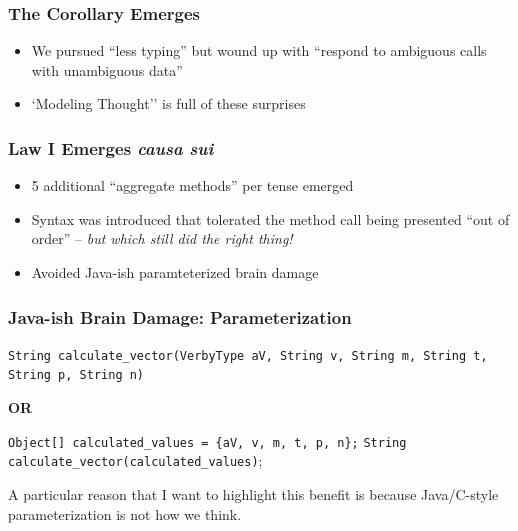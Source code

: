 \documentclass[slidestop,compress,mathserif]{beamer}
\begin{document}
\begin{frame}
	\frametitle{The Corollary Emerges}
	\begin{itemize}
		\item 	We pursued ``less typing'' but wound up with ``respond to ambiguous calls with unambiguous data''
		\pause
		\item 	`Modeling Thought'' is full of these surprises
	\end{itemize}
\end{frame}


\begin{frame}
	\frametitle{Law I Emerges \emph{causa sui}}
	\begin{itemize}
		\item 5 additional ``aggregate methods'' per tense emerged
		\pause
		\item Syntax was introduced that tolerated the method call being presented ``out of order'' -- \emph{but which still did the right thing!}
		\pause
		\item Avoided Java-ish paramteterized brain damage
	\end{itemize}
\end{frame}


\begin{frame}
	\frametitle{Java-ish Brain Damage:  Parameterization}	
 	\texttt{String calculate\_vector(VerbyType aV, String v, String m, String t, String p, String n)}
	\vskip 0.5cm

	\begin{center}
		\textbf{OR}
	\end{center}

	\vskip 0.5cm	
	\texttt{Object[] calculated\_values = \{aV, v, m, t, p, n\};} 
	\texttt{String calculate\_vector(calculated\_values)}; 	
\end{frame}
\note
{A particular reason that I want to highlight this benefit is because Java/C-style
parameterization is not how we think.
}
\end{document}
